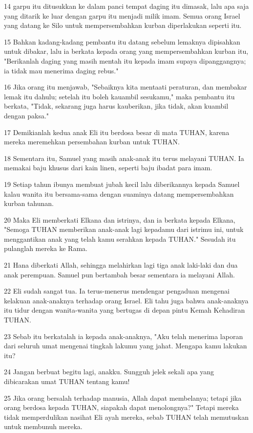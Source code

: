\par 14 garpu itu ditusukkan ke dalam panci tempat daging itu dimasak, lalu apa saja yang ditarik ke luar dengan garpu itu menjadi milik imam. Semua orang Israel yang datang ke Silo untuk mempersembahkan kurban diperlakukan seperti itu.
\par 15 Bahkan kadang-kadang pembantu itu datang sebelum lemaknya dipisahkan untuk dibakar, lalu ia berkata kepada orang yang mempersembahkan kurban itu, "Berikanlah daging yang masih mentah itu kepada imam supaya dipanggangnya; ia tidak mau menerima daging rebus."
\par 16 Jika orang itu menjawab, "Sebaiknya kita mentaati peraturan, dan membakar lemak itu dahulu; setelah itu boleh kauambil sesukamu," maka pembantu itu berkata, "Tidak, sekarang juga harus kauberikan, jika tidak, akan kuambil dengan paksa."
\par 17 Demikianlah kedua anak Eli itu berdosa besar di mata TUHAN, karena mereka meremehkan persembahan kurban untuk TUHAN.
\par 18 Sementara itu, Samuel yang masih anak-anak itu terus melayani TUHAN. Ia memakai baju khusus dari kain linen, seperti baju ibadat para imam.
\par 19 Setiap tahun ibunya membuat jubah kecil lalu diberikannya kepada Samuel kalau wanita itu bersama-sama dengan suaminya datang mempersembahkan kurban tahunan.
\par 20 Maka Eli memberkati Elkana dan istrinya, dan ia berkata kepada Elkana, "Semoga TUHAN memberikan anak-anak lagi kepadamu dari istrimu ini, untuk menggantikan anak yang telah kamu serahkan kepada TUHAN." Sesudah itu pulanglah mereka ke Rama.
\par 21 Hana diberkati Allah, sehingga melahirkan lagi tiga anak laki-laki dan dua anak perempuan. Samuel pun bertambah besar sementara ia melayani Allah.
\par 22 Eli sudah sangat tua. Ia terus-menerus mendengar pengaduan mengenai kelakuan anak-anaknya terhadap orang Israel. Eli tahu juga bahwa anak-anaknya itu tidur dengan wanita-wanita yang bertugas di depan pintu Kemah Kehadiran TUHAN.
\par 23 Sebab itu berkatalah ia kepada anak-anaknya, "Aku telah menerima laporan dari seluruh umat mengenai tingkah lakumu yang jahat. Mengapa kamu lakukan itu?
\par 24 Jangan berbuat begitu lagi, anakku. Sungguh jelek sekali apa yang dibicarakan umat TUHAN tentang kamu!
\par 25 Jika orang bersalah terhadap manusia, Allah dapat membelanya; tetapi jika orang berdosa kepada TUHAN, siapakah dapat menolongnya?" Tetapi mereka tidak memperdulikan nasihat Eli ayah mereka, sebab TUHAN telah memutuskan untuk membunuh mereka.
